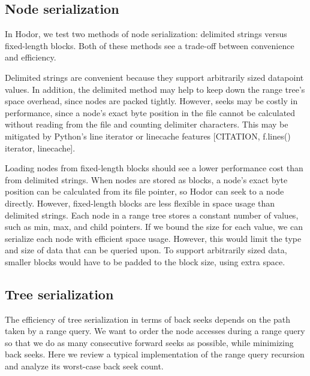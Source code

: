 \documentclass[11pt, oneside]{article}
\begin{document}
\subsection{Node serialization}

In Hodor, we test two methods of node serialization: delimited strings versus
fixed-length blocks. Both of these methods see a trade-off between convenience
and efficiency. 

Delimited strings are convenient because they support arbitrarily sized
datapoint values. In addition, the delimited method may help to keep down the
range tree's space overhead, since nodes are packed tightly. However, seeks may
be costly in performance, since a node's exact byte position in the file cannot
be calculated without reading from the file and counting delimiter characters.
This may be mitigated by Python's line iterator or linecache features
[CITATION, f.lines() iterator, linecache]. 

Loading nodes from fixed-length blocks should see a lower performance cost than
from delimited strings. When nodes are stored as blocks, a node's exact byte
position can be calculated from its file pointer, so Hodor can seek to a node
directly. However, fixed-length blocks are less flexible in space usage than
delimited strings. Each node in a range tree stores a constant number of
values, such as min, max, and child pointers. If we bound the size for each
value, we can serialize each node with efficient space usage. However, this
would limit the type and size of data that can be queried upon. To support
arbitrarily sized data, smaller blocks would have to be padded to the block
size, using extra space. 


\subsection{Tree serialization}


The efficiency of tree serialization in terms of back seeks depends on the path
taken by a range query. We want to order the node accesses during a range query
so that we do as many consecutive forward seeks as possible, while minimizing
back seeks. Here we review a typical implementation of the range query
recursion and analyze its worst-case back seek count. 

\end{document}
